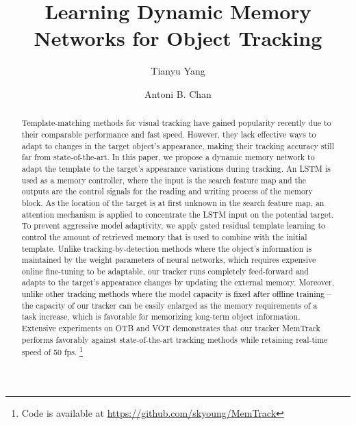 \documentclass[runningheads]{llncs}
\newcommand{\tyy}[1]{\textcolor{black}{#1}}
\begin{document}
%
\title{Learning Dynamic Memory Networks for Object Tracking} 

%
\author{Tianyu Yang \and Antoni B. Chan}
%
%

%
\maketitle              %
%
\begin{abstract}
	Template-matching methods for visual tracking have gained popularity recently due to their comparable performance and fast speed. However, they lack effective ways to adapt to changes in the target object's appearance, making their tracking accuracy still far from state-of-the-art. In this paper, we propose a dynamic memory network to adapt the template to the target's appearance variations during tracking. An LSTM is used as a memory controller, where the input is the search feature map and the outputs are the control signals for the reading and writing process of the memory block. As the location of the target is at first unknown in the search feature map, an attention mechanism is applied to concentrate the LSTM input on the potential target. To prevent aggressive model adaptivity, we apply gated residual template learning to control the amount of retrieved memory that is used to combine with the initial template. Unlike tracking-by-detection methods where the object's information is maintained by the weight parameters of neural networks, which requires expensive online fine-tuning to be adaptable, our tracker runs completely feed-forward and adapts to the target's appearance changes by updating the external memory. Moreover, \tyy{unlike other tracking methods where the model capacity is fixed after offline training} -- the capacity of our tracker can be easily enlarged as the memory requirements of a task increase, which is favorable for memorizing long-term object information. Extensive experiments on OTB and VOT demonstrates that our tracker MemTrack performs favorably against state-of-the-art tracking methods while retaining real-time speed of 50 fps. \footnote{Code is available at \url{https://github.com/skyoung/MemTrack}}
	
\end{abstract}
\end{document}
